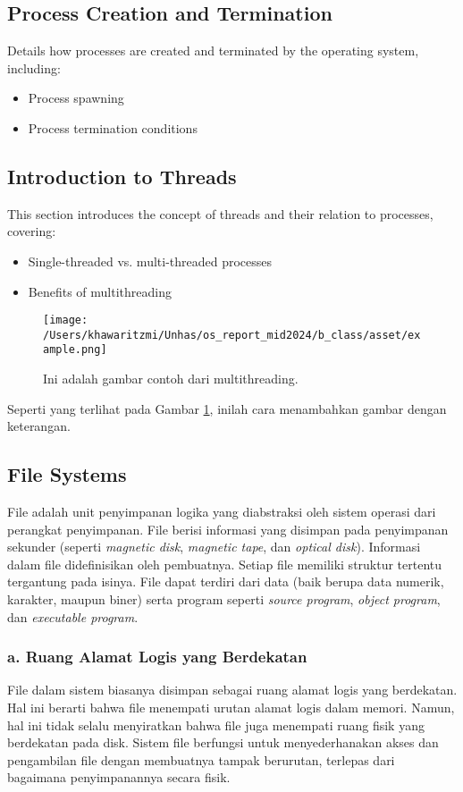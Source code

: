 \documentclass[12pt]{article}
\begin{document}
\subsection{Process Creation and Termination}
Details how processes are created and terminated by the operating system, including:
\begin{itemize}
    \item Process spawning
    \item Process termination conditions
\end{itemize}

\subsection{Introduction to Threads}
This section introduces the concept of threads and their relation to processes, covering:
\begin{itemize}
    \item Single-threaded vs. multi-threaded processes
    \item Benefits of multithreading
\end{itemize}

\begin{figure}[h]
    \centering
    \texttt{[image: /Users/khawaritzmi/Unhas/os\_report\_mid2024/b\_class/asset/example.png]}  %
    \caption{Ini adalah gambar contoh dari multithreading.}
    \label{fig:contoh_gambar}
\end{figure}

Seperti yang terlihat pada Gambar \ref{fig:contoh_gambar}, inilah cara menambahkan gambar dengan keterangan.

\subsection{File Systems}
File adalah unit penyimpanan logika yang diabstraksi oleh sistem operasi dari perangkat penyimpanan. File berisi informasi yang disimpan pada penyimpanan sekunder (seperti \textit{magnetic disk}, \textit{magnetic tape}, dan \textit{optical disk}). Informasi dalam file didefinisikan oleh pembuatnya. Setiap file memiliki struktur tertentu tergantung pada isinya. File dapat terdiri dari data (baik berupa data numerik, karakter, maupun biner) serta program seperti \textit{source program}, \textit{object program}, dan \textit{executable program}.

\subsubsection*{a. Ruang Alamat Logis yang Berdekatan}
File dalam sistem biasanya disimpan sebagai ruang alamat logis yang berdekatan. Hal ini berarti bahwa file menempati urutan alamat logis dalam memori. Namun, hal ini tidak selalu menyiratkan bahwa file juga menempati ruang fisik yang berdekatan pada disk. Sistem file berfungsi untuk menyederhanakan akses dan pengambilan file dengan membuatnya tampak berurutan, terlepas dari bagaimana penyimpanannya secara fisik.
\end{document}
